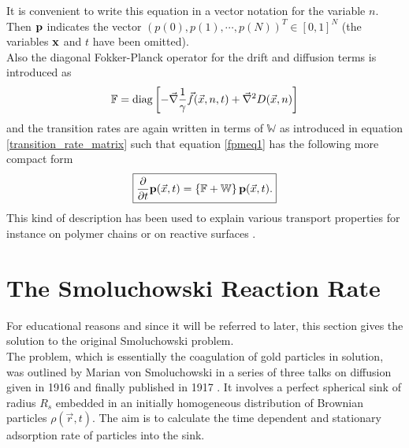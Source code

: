 It is convenient to write this equation in a vector notation for the variable $n$. Then $\boldsymbol{\mathbf{p}}$ indicates the vector $(p(0),p(1),\cdots,p(N))^{T} \in[0,1]^N$ (the variables $\boldsymbol{\mathbf{x}}$ and $t$ have been omitted). \\ 
Also the diagonal Fokker-Planck operator for the drift and diffusion terms is introduced as
\begin{equation}
    \mathbb{F} = {\rm diag} \left[- \vec{ \nabla } \frac{1}{\gamma}\vec{f}(\vec{x},n,t) + \vec{\nabla}^{2} D(\vec{x},n) \right]
    \label{fpo}
\end{equation}
and the transition rates are again written in terms of $\mathbb{W}$ as introduced in equation \eqref{transition_rate_matrix} such that equation \eqref{fpmeq1} has the following more compact form
\begin{equation}
    \boxed{\frac{\partial}{\partial t} \boldsymbol{\mathbf{p}}(\vec{x},t) = \left\{ \mathbb{F} + \mathbb{W} \right\} \boldsymbol{\mathbf{p}}(\vec{x},t).}
    \label{fpmeq2}
\end{equation}
This kind of description has been used to explain various transport properties for instance on polymer chains or on reactive surfaces \cite{Friedman1968,Caceres1990}.
\section{The Smoluchowski Reaction Rate}
\label{K_s}
For educational reasons and since it will be referred to later, this section gives the solution to the original Smoluchowski problem. \\
The problem, which is essentially the coagulation of gold particles in solution, was outlined by Marian von Smoluchowski in a series of three talks on diffusion given in 1916 \cite{Smoluchowski1916} and finally published in 1917 \cite{Smoluchowski1917a}. It involves a perfect spherical sink of radius $R_s$ embedded in an initially homogeneous distribution of Brownian particles $\rho(\vec{r},t)$. The aim is to calculate the time dependent and stationary adsorption rate of particles into the sink. \\
\vspace{- .5 cm} \par

